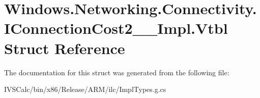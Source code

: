 \hypertarget{struct_windows_1_1_networking_1_1_connectivity_1_1_i_connection_cost2_____impl_1_1_vtbl}{}\section{Windows.\+Networking.\+Connectivity.\+I\+Connection\+Cost2\+\_\+\+\_\+\+Impl.\+Vtbl Struct Reference}
\label{struct_windows_1_1_networking_1_1_connectivity_1_1_i_connection_cost2_____impl_1_1_vtbl}


The documentation for this struct was generated from the following file\+:\begin{DoxyCompactItemize}
\item 
I\+V\+S\+Calc/bin/x86/\+Release/\+A\+R\+M/ilc/Impl\+Types.\+g.\+cs\end{DoxyCompactItemize}

